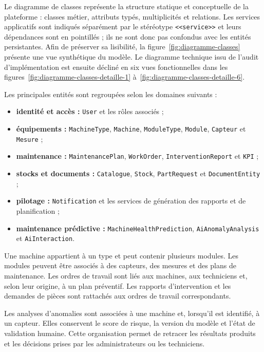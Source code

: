 Le diagramme de classes représente la structure statique et conceptuelle de la plateforme : classes métier, attributs typés, multiplicités et relations. Les services applicatifs sont indiqués séparément par le stéréotype \texttt{<<service>>} et leurs dépendances sont en pointillés ; ils ne sont donc pas confondus avec les entités persistantes. Afin de préserver sa lisibilité, la figure~\ref{fig:diagramme-classes} présente une vue synthétique du modèle. Le diagramme technique issu de l’audit d’implémentation est ensuite décliné en six vues fonctionnelles dans les figures~\ref{fig:diagramme-classes-detaille-1} à~\ref{fig:diagramme-classes-detaille-6}.

Les principales entités sont regroupées selon les domaines suivants :

\begin{itemize}
    \item \textbf{identité et accès :} \texttt{User} et les rôles associés ;
    \item \textbf{équipements :} \texttt{MachineType}, \texttt{Machine}, \texttt{ModuleType}, \texttt{Module}, \texttt{Capteur} et \texttt{Mesure} ;
    \item \textbf{maintenance :} \texttt{MaintenancePlan}, \texttt{WorkOrder}, \texttt{InterventionReport} et \texttt{KPI} ;
    \item \textbf{stocks et documents :} \texttt{Catalogue}, \texttt{Stock}, \texttt{PartRequest} et \texttt{DocumentEntity} ;
    \item \textbf{pilotage :} \texttt{Notification} et les services de génération des rapports et de planification ;
    \item \textbf{maintenance prédictive :} \texttt{MachineHealthPrediction}, \texttt{AiAnomalyAnalysis} et \texttt{AiInteraction}.
\end{itemize}

Une machine appartient à un type et peut contenir plusieurs modules. Les modules peuvent être associés à des capteurs, des mesures et des plans de maintenance. Les ordres de travail sont liés aux machines, aux techniciens et, selon leur origine, à un plan préventif. Les rapports d’intervention et les demandes de pièces sont rattachés aux ordres de travail correspondants.

Les analyses d’anomalies sont associées à une machine et, lorsqu’il est identifié, à un capteur. Elles conservent le score de risque, la version du modèle et l’état de validation humaine. Cette organisation permet de retracer les résultats produits et les décisions prises par les administrateurs ou les techniciens.

